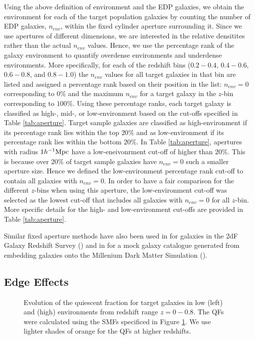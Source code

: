 \documentclass{emulateapj}
\begin{document}
Using the above definition of environment and the EDP galaxies, we obtain the environment for each of the target population galaxies by counting the number of EDP galaxies, 
$n_{env}$, within the fixed cylinder aperture surrounding it. 
Since we use apertures of different dimensions, we are interested in the relative densitites rather than the actual $n_{env}$ values.
Hence, we use the percentage rank of the galaxy environment to quantify overdense environments and underdense environments.
More specifically, for each of the redshift bins ($0.2-0.4$, $0.4-0.6$, $0.6-0.8$, and $0.8-1.0$) the $n_{env}$ values for all target galaxies in that bin are listed and assigned a percentage rank based on their position in the list: $n_{env} = 0$ corresponding to $0\%$ and the maximum $n_{env}$ for a target galaxy in the $z$-bin corresponding to $100\%$. 
Using these percentage ranks, each target galaxy is classified as high-, mid-, or low-environment based on the cut-offs specified in Table \ref{tab:aperture}. 
Target sample galaxies are classified as high-environment if its percentage rank lies within the top $20\%$ and as low-environment if its percentage rank lies within the bottom $20\%$. 
In Table \ref{tab:aperture}, apertures with radius $1 h^{-1} \rm{Mpc}$ have a low-eneivonrment cut-off of higher than $20\%$.
This is because over $20\%$ of target sample galaxies have $n_{env}=0$ such a smaller aperture size.
Hence we defined the low-environment percentage rank cut-off to contain all galaxies with $n_{env}=0$. 
In order to have a fair comparison for the different $z$-bins when using this aperture, the low-environment cut-off was selected as the lowest cut-off that includes all galaxies with $n_{env}=0$ for all $z$-bin.
More specific details for the high- and low-environment cut-offs are provided in Table \ref{tab:aperture}.

Similar fixed aperture methods have also been used in \cite{Croton:2005aa} for galaxies in the 2dF Galaxy Redshift Survey (\cite{Colless:2003aa}) and in \cite{Muldrew:2012aa} 
for a mock galaxy catalogue generated from embedding galaxies onto the Millenium Dark Matter Simulation (\cite{Springel:2005aa}). 

\subsection{Edge Effects} \label{sec:edgeeffect}
\begin{figure*}
    \begin{center}
        \leavevmode
        \label{fig:smf}
        \caption{Evolution of the quiescent fraction for target galaxies in low (left) and (high) environments
from redshift range $z=0-0.8$. The QFs were calculated using the SMFs specificed in Figure \ref{fig:smf}. We use
lighter shades of orange for the QFs at higher redshifts.}
    \end{center}
\end{figure*}
\end{document}
